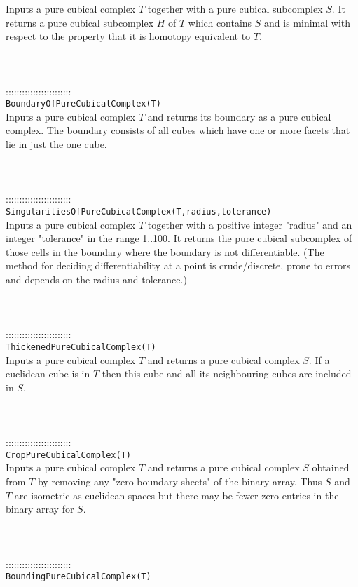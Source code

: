\documentclass[a4paper,11pt]{report}
\begin{document}
{ Inputs a pure cubical complex $T$ together with a pure cubical subcomplex $S$. It returns a pure cubical subcomplex $H$ of $T$ which contains $S$ and is minimal with respect to the property that it is homotopy equivalent to $T$. \\
 \\
 \\
 \\
 ::::::::::::::::::::::::\\
 \texttt{BoundaryOfPureCubicalComplex(T)}\\
 

 Inputs a pure cubical complex $T$ and returns its boundary as a pure cubical complex. The boundary consists of
all cubes which have one or more facets that lie in just the one cube. \\
 \\
 \\
 \\
 ::::::::::::::::::::::::\\
 \texttt{SingularitiesOfPureCubicalComplex(T,radius,tolerance)}\\
 

 Inputs a pure cubical complex $T$ together with a positive integer "radius" and an integer "tolerance" in the
range 1..100. It returns the pure cubical subcomplex of those cells in the
boundary where the boundary is not differentiable. (The method for deciding
differentiability at a point is crude/discrete, prone to errors and depends on
the radius and tolerance.) \\
 \\
 \\
 \\
 ::::::::::::::::::::::::\\
 \texttt{ThickenedPureCubicalComplex(T)}\\
 

 Inputs a pure cubical complex $T$ and returns a pure cubical complex $S$. If a euclidean cube is in $T$ then this cube and all its neighbouring cubes are included in $S$. \\
 \\
 \\
 \\
 ::::::::::::::::::::::::\\
 \texttt{CropPureCubicalComplex(T)}\\
 

 Inputs a pure cubical complex $T$ and returns a pure cubical complex $S$ obtained from $T$ by removing any "zero boundary sheets" of the binary array. Thus $S$ and $T$ are isometric as euclidean spaces but there may be fewer zero entries in the
binary array for $S$. \\
 \\
 \\
 \\
 ::::::::::::::::::::::::\\
 \texttt{BoundingPureCubicalComplex(T)}\\
 

}
\end{document}
